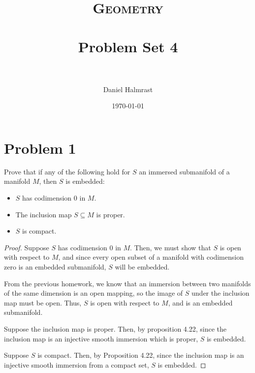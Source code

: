 \documentclass[fontsize=11pt]{scrartcl} %
\title{	
\normalfont \normalsize 
\textsc{Geometry} \\ [25pt] %
\horrule{0.5pt} \\[0.4cm] %
\huge Problem Set 4 \\ %
\horrule{2pt} \\[0.5cm] %
}
\author{Daniel Halmrast} %
\date{\normalsize\today} %
\numberwithin{equation}{section} %
\numberwithin{figure}{section} %
\numberwithin{table}{section} %
\begin{document}
\maketitle %

\section*{Problem 1} %
Prove that if any of the following hold for $S$ an immersed submanifold of a
manifold $M$, then $S$ is embedded:
\begin{itemize}
    \item $S$ has codimension $0$ in $M$.
    \item The inclusion map $S\subseteq M$ is proper.
    \item $S$ is compact.
\end{itemize}

\begin{proof}
    Suppose $S$ has codimension $0$ in $M$. Then, we must show that $S$ is open
    with respect to $M$, and since every open subset of a manifold with
    codimension zero is an embedded submanifold, $S$ will be embedded.

    From the previous homework, we know that an immersion between two manifolds
    of the same dimension is an open mapping, so the image of $S$ under the
    inclusion map must be open. Thus, $S$ is open with respect to $M$, and is an
    embedded submanifold.

    Suppose the inclusion map is proper. Then, by proposition 4.22, since the
    inclusion map is an injective smooth immersion which is proper, $S$ is
    embedded.

    Suppose $S$ is compact. Then, by Proposition 4.22, since the inclusion map
    is an injective smooth immersion from a compact set, $S$ is embedded.
\end{proof}

\newpage
\end{document}
